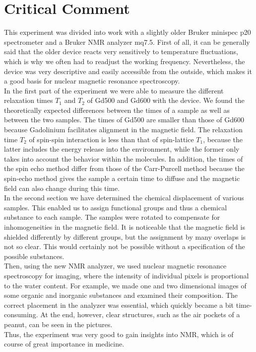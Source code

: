 \section{Critical Comment}
This experiment was divided into work with a slightly older Bruker minispec p20 spectrometer and a Bruker NMR analyzer mq7.5.
First of all, it can be generally said that the older device reacts very sensitively to temperature fluctuations, which is why we often had to readjust the working frequency.
Nevertheless, the device was very descriptive and easily accessible from the outside, which makes it a good basis for nuclear magnetic resonance spectroscopy.\\
In the first part of the experiment we were able to measure the different relaxation times $T_1$ and $T_2$ of Gd500 and Gd600 with the device.
We found the theoretically expected differences between the times of a sample as well as between the two samples.
The times of Gd500 are smaller than those of Gd600 because Gadolinium facilitates alignment in the magnetic field.
The relaxation time $T_2$ of spin-spin interaction is less than that of spin-lattice $T_1$, because the latter includes the energy release into the environment, while the former only takes into account the behavior within the molecules.
In addition, the times of the spin echo method differ from those of the Carr-Purcell method because the spin-echo method gives the sample a certain time to diffuse and the magnetic field can also change during this time.\\
In the second section we have determined the chemical displacement of various samples.
This enabled us to assign functional groups and thus a chemical substance to each sample.
The samples were rotated to compensate for inhomogeneities in the magnetic field.
It is noticeable that the magnetic field is shielded differently by different groups, but the assignment by many overlaps is not so clear.
This would certainly not be possible without a specification of the possible substances.\\
Then, using the new NMR analyzer, we used nuclear magnetic resonance spectroscopy for imaging, where the intensity of individual pixels is proportional to the water content.
For example, we made one and two dimensional images of some organic and inorganic substances and examined their composition.
The correct placement in the analyzer was essential, which quickly became a bit time-consuming.
At the end, however, clear structures, such as the air pockets of a peanut, can be seen in the pictures.\\
Thus, the experiment was very good to gain insights into NMR, which is of course of great importance in medicine. 